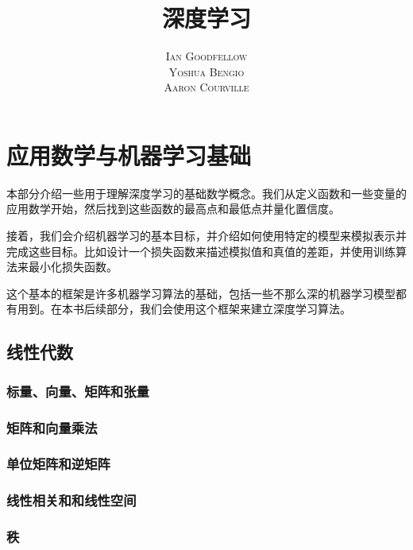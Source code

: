 \documentclass[a4paper,11pt]{book}
\title{\Huge \textbf{深度学习} }
\author{\textsc{Ian Goodfellow} \\ \textsc{Yoshua Bengio} \\ \textsc{Aaron Courville}}
\begin{document}
\frontmatter
\maketitle

\tableofcontents
\listoffigures
\listoftables

\mainmatter




\part{应用数学与机器学习基础}
\label{part:1}

本部分介绍一些用于理解深度学习的基础数学概念。我们从定义函数和一些变量的应用数学开始，然后找到这些函数的最高点和最低点并量化置信度。


接着，我们会介绍机器学习的基本目标，并介绍如何使用特定的模型来模拟表示并完成这些目标。比如设计一个损失函数来描述模拟值和真值的差距，并使用训练算法来最小化损失函数。


这个基本的框架是许多机器学习算法的基础，包括一些不那么深的机器学习模型都有用到。在本书后续部分，我们会使用这个框架来建立深度学习算法。

\chapter{线性代数}
\label{chap:2}

\section{标量、向量、矩阵和张量}
\label{sec:2.1}

\section{矩阵和向量乘法}
\label{sec:2.2}

\section{单位矩阵和逆矩阵}
\label{sec:2.3}

\section{线性相关和和线性空间}
\label{sec:2.4}

\section{秩}
\label{sec:2.5}
\end{document}
